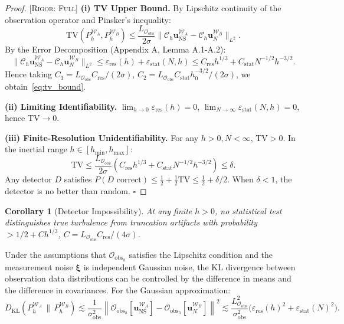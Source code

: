 \documentclass[11pt,a4paper]{article}
\newtheorem{corollary}[theorem]{Corollary}
\theoremstyle{definition}
\theoremstyle{remark}
\newcommand{\TV}{\mathrm{TV}}
\newcommand{\norm}[1]{\left\lVert#1\right\rVert}
\newcommand{\Obs}{\mathcal{O}_{\text{obs}}}
\newcommand{\uN}{\bm{u}_N}
\newcommand{\uNS}{\bm{u}_{\text{NS}}}
\newcommand{\epsRes}{\varepsilon_{\text{res}}}
\newcommand{\epsStat}{\varepsilon_{\text{stat}}}
\newcommand{\rigorFull}{\textsc{[Rigor: Full]}}
\begin{document}
\begin{proof}
\rigorFull
\textbf{(i) TV Upper Bound.} By Lipschitz continuity of the observation operator and Pinsker's inequality:
\[
\TV(P_h^{\mathcal{W}_A}, P_h^{\mathcal{W}_B}) \leq \frac{L_{\Obs}}{2\sigma}\|\mathcal{C}_h \bm{u}_{\text{NS}}^{\mathcal{W}_A} - \mathcal{C}_h \bm{u}_N^{\mathcal{W}_B}\|_{L^2}.
\]
By the Error Decomposition (Appendix A, Lemma A.1-A.2):
\[
\|\mathcal{C}_h \bm{u}_{\text{NS}}^{\mathcal{W}_A} - \mathcal{C}_h \bm{u}_N^{\mathcal{W}_B}\|_{L^2} \leq \varepsilon_{\text{res}}(h) + \varepsilon_{\text{stat}}(N,h) \leq C_{\text{res}} h^{1/3} + C_{\text{stat}} N^{-1/2} h^{-3/2}.
\]
Hence taking $C_1 = L_{\Obs} C_{\text{res}} / (2\sigma)$, $C_2 = L_{\Obs} C_{\text{stat}} h_0^{-3/2} / (2\sigma)$, we obtain~\eqref{eq:tv_bound}.

\textbf{(ii) Limiting Identifiability.} $\lim_{h\to 0} \varepsilon_{\text{res}}(h) = 0$, $\lim_{N\to\infty} \varepsilon_{\text{stat}}(N,h) = 0$, hence $\TV \to 0$.

\textbf{(iii) Finite-Resolution Unidentifiability.} For any $h>0, N<\infty$, $\TV > 0$. In the inertial range $h \in [h_{\min}, h_{\max}]$:
\[
\TV \leq \frac{L_{\Obs}}{2\sigma}\left(C_{\text{res}} h^{1/3} + C_{\text{stat}} N^{-1/2} h^{-3/2}\right) \leq \delta.
\]
Any detector $D$ satisfies $P(D\text{ correct}) \leq \frac{1}{2} + \frac{1}{2}\TV \leq \frac{1}{2} + \delta/2$. When $\delta < 1$, the detector is no better than random. $\square$
\end{proof}

\begin{corollary}[Detector Impossibility]
\label{cor:detector_impossible}
At any finite $h>0$, no statistical test distinguishes true turbulence from truncation artifacts with probability $> 1/2 + C h^{1/3}$, $C = L_{\Obs}C_{\text{res}}/(4\sigma)$.
\end{corollary}

Under the assumptions that $\Obs_h$ satisfies the Lipschitz condition and the measurement noise $\bm{\xi}$ is independent Gaussian noise, the KL divergence between observation data distributions can be controlled by the difference in means and the difference in covariances. For the Gaussian approximation:
\begin{equation}
  D_{\text{KL}}(P_h^{\mathcal{W}_A} \,\|\, P_h^{\mathcal{W}_B})
  \lesssim \frac{1}{\sigma_{\text{obs}}^2} \norm{\Obs_h[\uNS^{\mathcal{W}_A}] - \Obs_h[\uN^{\mathcal{W}_B}]}^2
  \lesssim \frac{L_{\Obs}^2}{\sigma_{\text{obs}}^2} \bigl(\epsRes(h)^2 + \epsStat(N)^2\bigr).
\end{equation}
\end{document}
